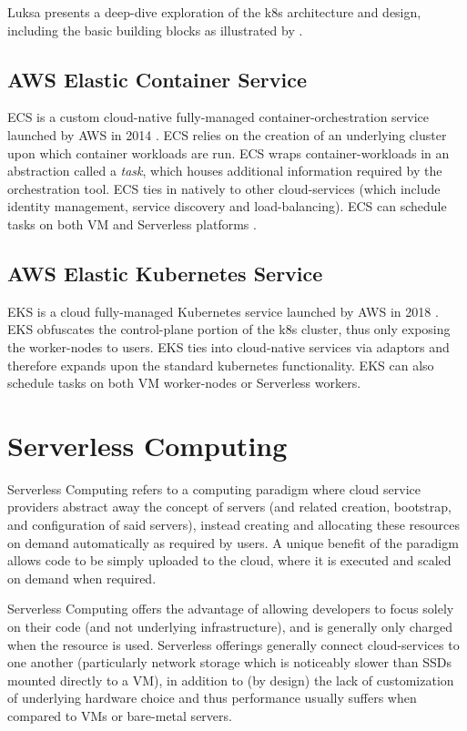 Luksa \cite{luksa2017kubernetes} presents a deep-dive exploration of the k8s architecture and design, including the basic building blocks as illustrated by \cite[Figure 1.9]{luksa2017kubernetes}.


\subsection{AWS Elastic Container Service}
ECS is a custom cloud-native fully-managed container-orchestration service launched by AWS in 2014 \cite{ecs}.
ECS relies on the creation of an underlying cluster upon which container workloads are run.
ECS wraps container-workloads in an abstraction called a \textit{task}, which houses additional information required by the orchestration tool.
ECS ties in natively to other cloud-services (which include identity management, service discovery and load-balancing).
ECS can schedule tasks on both VM and Serverless platforms \cite{ecs_2022}.

\subsection{AWS Elastic Kubernetes Service}
EKS is a cloud fully-managed Kubernetes service launched by AWS in 2018 \cite{eks}. 
EKS obfuscates the control-plane portion of the k8s cluster, thus only exposing the worker-nodes to users.
EKS ties into cloud-native services via adaptors and therefore expands upon the standard kubernetes functionality.
EKS can also schedule tasks on both VM worker-nodes or Serverless workers\cite{hansen_2022}. 

\section{Serverless Computing}

Serverless Computing refers to a computing paradigm where cloud service providers abstract away the concept of servers (and related creation, bootstrap, and configuration of said servers),
instead creating and allocating these resources on demand automatically as required by users. A unique benefit of the paradigm allows code to be simply uploaded to the cloud, where it is 
executed and scaled on demand when required\cite{hellerstein2018serverless}.

Serverless Computing offers the advantage of allowing developers to focus solely on their code (and not underlying infrastructure), and is generally only charged when the resource is used\cite{jonas2019cloud}.
Serverless offerings generally connect cloud-services to one another (particularly network storage which is noticeably slower than SSDs mounted directly to a VM), 
in addition to (by design) the lack of customization of underlying hardware choice and thus performance usually suffers when compared to VMs or bare-metal servers\cite{hellerstein2018serverlessdisadvantages}.


